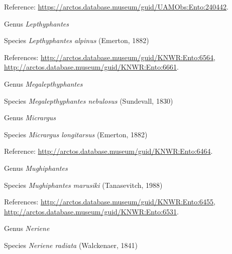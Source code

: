 \documentclass[9pt, article]{memoir}
\begin{document}
\begin{multicols}{2}
\vspace{6pt}Reference: 
\url{https://arctos.database.museum/guid/UAMObs:Ento:240442}.

\vspace{6pt}\noindent\hspace{30pt}Genus \textit{Lepthyphantes}


\vspace{6pt}\noindent\hspace{36pt}Species \textit{Lepthyphantes alpinus} (Emerton, 1882)


\vspace{6pt}References: 
\url{http://arctos.database.museum/guid/KNWR:Ento:6564}, 
\url{http://arctos.database.museum/guid/KNWR:Ento:6661}.

\vspace{6pt}\noindent\hspace{30pt}Genus \textit{Megalepthyphantes}


\vspace{6pt}\noindent\hspace{36pt}Species \textit{Megalepthyphantes nebulosus} (Sundevall, 1830)


\vspace{6pt}\noindent\hspace{30pt}Genus \textit{Micrargus}


\vspace{6pt}\noindent\hspace{36pt}Species \textit{Micrargus longitarsus} (Emerton, 1882)


\vspace{6pt}Reference: 
\url{http://arctos.database.museum/guid/KNWR:Ento:6464}.

\vspace{6pt}\noindent\hspace{30pt}Genus \textit{Mughiphantes}


\vspace{6pt}\noindent\hspace{36pt}Species \textit{Mughiphantes marusiki} (Tanasevitch, 1988)


\vspace{6pt}References: 
\url{http://arctos.database.museum/guid/KNWR:Ento:6455}, 
\url{http://arctos.database.museum/guid/KNWR:Ento:6531}.

\vspace{6pt}\noindent\hspace{30pt}Genus \textit{Neriene}


\vspace{6pt}\noindent\hspace{36pt}Species \textit{Neriene radiata} (Walckenaer, 1841)



\end{multicols}
\end{document}
